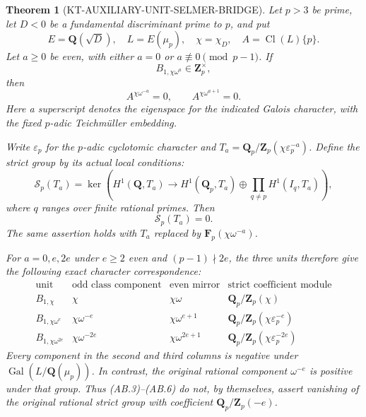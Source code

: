 \documentclass[11pt,a4paper]{article}
\newtheorem{theorem}{Theorem}[section]
\theoremstyle{definition}
\begin{document}
\begin{theorem}[KT-AUXILIARY-UNIT-SELMER-BRIDGE]
Let $p>3$ be prime, let $D<0$ be a fundamental discriminant
prime to $p$, and put
\[
 E=\mathbf Q(\sqrt D),\quad L=E(\mu_p),\quad
 \chi=\chi_D,\quad A=\operatorname{Cl}(L)\{p\}.
                                                               \tag{AB.1}
\]
Let $a\ge0$ be even, with either $a=0$ or
$a\not\equiv0\pmod{p-1}$.  If
\[
                         B_{1,\chi\omega^a}\in\mathbf Z_p^\times,
                                                               \tag{AB.2}
\]
then
\[
             A^{\chi\omega^{-a}}=0,
             \qquad A^{\chi\omega^{a+1}}=0.               \tag{AB.3}
\]
Here a superscript denotes the eigenspace for the indicated
Galois character, with the fixed $p$-adic Teichm\"uller embedding.

Write $\varepsilon_p$ for the $p$-adic cyclotomic character and
$T_a=\mathbf Q_p/\mathbf Z_p(\chi\varepsilon_p^{-a})$.
Define the strict group by its actual local conditions:
\[
 \mathcal S_p(T_a)=\ker\left(H^1(\mathbf Q,T_a)\longrightarrow
 H^1(\mathbf Q_p,T_a)\oplus
       \prod_{q\ne p}H^1(I_q,T_a)\right),                 \tag{AB.4}
\]
where $q$ ranges over finite rational primes.  Then
\[
                            \mathcal S_p(T_a)=0.          \tag{AB.5}
\]
The same assertion holds with $T_a$ replaced by
$\mathbf F_p(\chi\omega^{-a})$.

For $a=0,e,2e$ under $e\ge2$ even and
$(p-1)\nmid2e$, the three units therefore give the following
exact character correspondence:
\[
\begin{array}{c|c|c|c}
\text{unit}&\text{odd class component}&\text{even mirror}
  &\text{strict coefficient module}\\ \hline
B_{1,\chi}&\chi&\chi\omega&\mathbf Q_p/\mathbf Z_p(\chi)\\
B_{1,\chi\omega^e}&\chi\omega^{-e}&\chi\omega^{e+1}
 &\mathbf Q_p/\mathbf Z_p(\chi\varepsilon_p^{-e})\\
B_{1,\chi\omega^{2e}}&\chi\omega^{-2e}&\chi\omega^{2e+1}
 &\mathbf Q_p/\mathbf Z_p(\chi\varepsilon_p^{-2e})
\end{array}                                                   \tag{AB.6}
\]
Every component in the second and third columns is negative
under $\operatorname{Gal}(L/\mathbf Q(\mu_p))$.
In contrast, the original rational component $\omega^{-e}$
is positive under that group.  Thus (AB.3)--(AB.6) do not,
by themselves, assert vanishing of the original rational
strict group with coefficient $\mathbf Q_p/\mathbf Z_p(-e)$.
\end{theorem}
\end{document}
